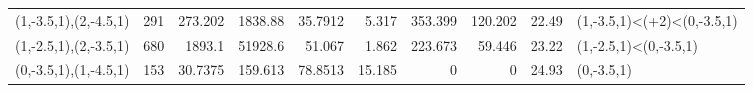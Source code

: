 \begin{tabular}{lrrrrrrrrl}
 (1,-3.5,1),(2,-4.5,1) &        291 &                          273.202  &                        1838.88  &                           35.7912 &                           5.317 &                           353.399 &                         120.202 &      22.49 & (1,-3.5,1)<(+2)<(0,-3.5,1) \\
 (1,-2.5,1),(2,-3.5,1) &        680 &                         1893.1    &                       51928.6   &                           51.067  &                           1.862 &                           223.673 &                          59.446 &      23.22 & (1,-2.5,1)<(0,-3.5,1)      \\
 (0,-3.5,1),(1,-4.5,1) &        153 &                           30.7375 &                         159.613 &                           78.8513 &                          15.185 &                             0     &                           0     &      24.93 & (0,-3.5,1)                 \\
\hline
\end{tabular}